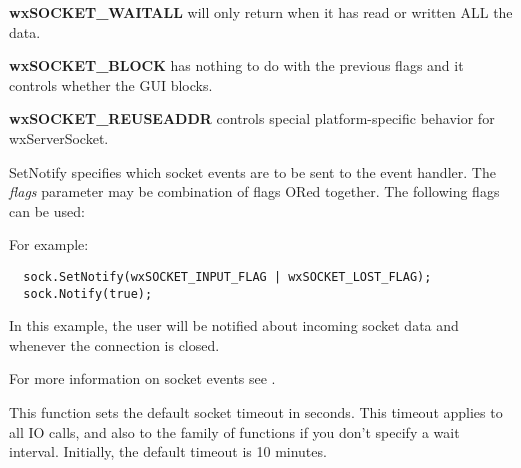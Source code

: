 {\bf wxSOCKET\_WAITALL} will only return when it has read or written ALL
the data.

{\bf wxSOCKET\_BLOCK} has nothing to do with the previous flags and
it controls whether the GUI blocks.

{\bf wxSOCKET\_REUSEADDR} controls special platform-specific behavior for wxServerSocket.

%
%
\label{wxsocketbasesetnotify}


SetNotify specifies which socket events are to be sent to the event handler.
The {\it flags} parameter may be combination of flags ORed together. The
following flags can be used:

\twocolwidtha{7cm}
\begin{twocollist}\itemsep=0pt
\end{twocollist}

For example:

\begin{verbatim}
  sock.SetNotify(wxSOCKET_INPUT_FLAG | wxSOCKET_LOST_FLAG);
  sock.Notify(true);
\end{verbatim}

In this example, the user will be notified about incoming socket data and
whenever the connection is closed.

For more information on socket events see .

%
%
\label{wxsocketbasesettimeout}


This function sets the default socket timeout in seconds. This timeout
applies to all IO calls, and also to the  family
of functions if you don't specify a wait interval. Initially, the default
timeout is 10 minutes.

%
%
\label{wxsocketbasepeek}


